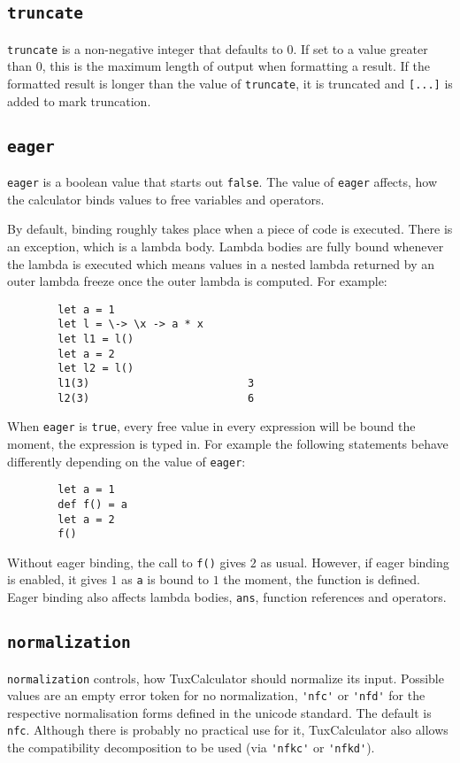 \documentclass[10pt]{article}
\begin{document}
    \subsection{\texttt{truncate}}\label{subsec:truncate}
    \verb|truncate| is a non-negative integer that defaults to $ 0 $.
    If set to a value greater than $ 0 $, this is the maximum length of output when formatting a result.
    If the formatted result is longer than the value of \verb|truncate|, it is truncated and \verb|[...]| is added to mark truncation.
    
    \subsection{\texttt{eager}}\label{subsec:eager}
    \verb|eager| is a boolean value that starts out \verb|false|.
    The value of \verb|eager| affects, how the calculator binds values to free variables and operators.
    
    By default, binding roughly takes place when a piece of code is executed.
    There is an exception, which is a lambda body.
    Lambda bodies are fully bound whenever the lambda is executed which means values in a nested lambda returned by an outer lambda freeze once the outer lambda is computed.
    For example:
    \begin{verbatim}
        let a = 1
        let l = \-> \x -> a * x
        let l1 = l()
        let a = 2
        let l2 = l()
        l1(3)                         3
        l2(3)                         6
    \end{verbatim}
    When \verb|eager| is \verb|true|, every free value in every expression will be bound the moment, the expression is typed in.
    For example the following statements behave differently depending on the value of \verb|eager|:
    \begin{verbatim}
        let a = 1
        def f() = a
        let a = 2
        f()
    \end{verbatim}
    Without eager binding, the call to \verb|f()| gives $ 2 $ as usual.
    However, if eager binding is enabled, it gives $ 1 $ as \verb|a| is bound to $ 1 $ the moment, the function is defined.
    Eager binding also affects lambda bodies, \verb|ans|, function references and operators.
    
    \subsection{\texttt{normalization}}\label{subsec:normalization}
    \verb|normalization| controls, how TuxCalculator should normalize its input.
    Possible values are an empty error token for no normalization, \verb|'nfc'| or \verb|'nfd'| for the respective normalisation forms defined in the unicode standard.
    The default is \verb|nfc|.
    Although there is probably no practical use for it, TuxCalculator also allows the compatibility decomposition to be used (via \verb|'nfkc'| or \verb|'nfkd'|).
    
\end{document}
